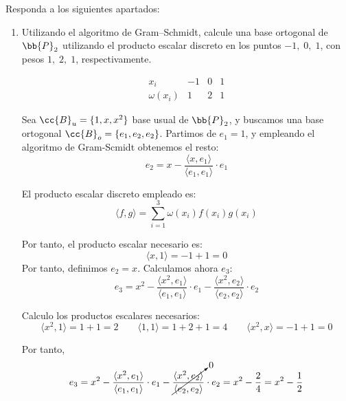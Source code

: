 \begin{ejercicio}
    Responda a los siguientes apartados:
    \begin{enumerate}
        \item Utilizando el algoritmo de Gram–Schmidt, calcule una base ortogonal de $\bb{P}_2$ utilizando el producto escalar discreto en los puntos $-1,\;0,\;1$, con pesos $1,\;2,\;1$, respectivamente.

        \begin{equation*}
            \begin{array}{c|ccc}
                x_i & -1 & 0 & 1 \\ \hline
                \omega(x_i) & 1 & 2 & 1
            \end{array}
        \end{equation*}

        Sea $\cc{B}_u=\{1,x,x^2\}$ base usual de $\bb{P}_2$, y buscamos una base ortogonal $\cc{B}_o=\{e_1, e_2, e_2\}$. Partimos de $e_1 = 1$, y empleando el algoritmo de Gram-Scmidt obtenemos el resto:
        \begin{equation*}
            e_2 = x - \frac{\langle x,e_1\rangle}{\langle e_1, e_1\rangle}\cdot e_1
        \end{equation*}

        El producto escalar discreto empleado es:
        \begin{equation*}
            \langle f,g\rangle = \sum_{i=1}^3 \omega(x_i)f(x_i)g(x_i)
        \end{equation*}

        Por tanto, el producto escalar necesario es:
        \begin{equation*}
            \langle x,1\rangle = -1+1=0
        \end{equation*}
        Por tanto, definimos $e_2=x$. Calculamos ahora $e_3$:
        \begin{equation*}
            e_3 = x^2 - \frac{\langle x^2,e_1\rangle}{\langle e_1, e_1\rangle}\cdot e_1 - \frac{\langle x^2,e_2\rangle}{\langle e_2, e_2\rangle}\cdot e_2
        \end{equation*}

        Calculo los productos escalares necesarios:
        \begin{equation*}
            \langle x^2,1\rangle = 1+1=2 \qquad
            \langle 1,1\rangle = 1+2+1=4 \qquad
            \langle x^2,x\rangle = -1+1=0
        \end{equation*}

        Por tanto,
        \begin{equation*}
            e_3 = x^2 - \frac{\langle x^2,e_1\rangle}{\langle e_1, e_1\rangle}\cdot e_1 - \cancelto{0}{\frac{\langle x^2,e_2\rangle}{\langle e_2, e_2\rangle}}\cdot e_2
            = x^2-\frac{2}{4} = x^2 - \frac{1}{2}
        \end{equation*}


\end{enumerate}
\end{ejercicio}
